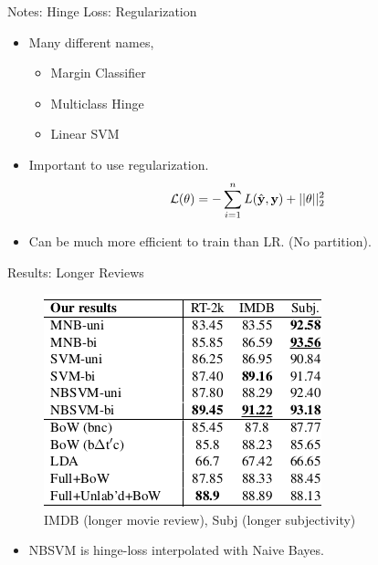 \documentclass{beamer}
\begin{document}
\begin{frame}{Notes: Hinge Loss: Regularization}
  \begin{itemize}
  \item   Many different names,
  \begin{itemize}
  \item Margin Classifier
  \item Multiclass Hinge
  \item Linear SVM
  \end{itemize}

  \item Important to use regularization.  
  \[ \mathcal{L}(\theta) = - \sum_{i=1}^n L(\hat{\mathbf{y}}, \mathbf{y}) + ||\theta||^2_2\] 

  \item Can be much more efficient to train than LR. (No partition).

  \end{itemize}
\end{frame}
  

\begin{frame}{Results: Longer Reviews}
  \begin{figure}
    \centering
    \includegraphics{svm}
    \caption{IMDB (longer movie review), Subj (longer subjectivity)}
  \end{figure}

  \begin{itemize}
  \item NBSVM is hinge-loss interpolated with Naive Bayes.
  \end{itemize}
\end{frame}
\end{document}
